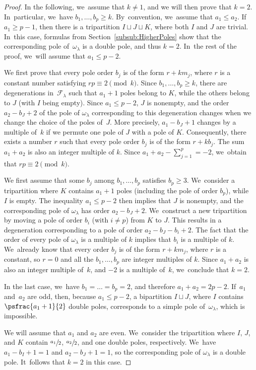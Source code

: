 \begin{proof}
In the following, we~assume that $k \neq 1$, and we will then prove that $k = 2$. In~particular, we~have $b_{1},\dots,b_{p} \geq k$. By~convention, we~assume that $a_{1} \leq a_{2}$. If~$a_{1} \geq p-1$, then there is a tripartition $I \sqcup J \sqcup K$, where both $I$ and $J$ are trivial. In~this case, formulas from Section~\ref{subsub:HigherPoles} show that the corresponding pole of~$\omega_{\lambda}$ is a double pole, and thus $k=2$. In~the rest of the proof, we~will assume that $a_{1} \leq p-2$.

We first prove that every pole order $b_{j}$ is of the form $r+km_{j}$, where $r$ is a constant number satisfying $rp \equiv 2\pmod{k}$. Since $b_{1},\dots,b_{p} \geq k$, there are degenerations in~$\mathcal{F}_{\lambda}$ such that $a_{1}+1$ poles belong to $K$, while the others belong to $J$ (with $I$ being empty). Since $a_{1} \leq p-2$, $J$ is nonempty, and the order $a_{2}-b_{J}+2$ of the pole of $\omega_{\lambda}$ corresponding to this degeneration changes when we change the choice of the poles of~$J$. More precisely, $a_{1}-b_{J}+1$ changes by a multiple of~$k$ if we permute one pole of $J$ with a pole of $K$. Consequently, there exists a number $r$ such that every pole order $b_{j}$ is of the form $r+kb_{j}$. The sum $a_{1}+a_{2}$ is also an integer multiple of $k$. Since $a_{1}+a_{2} - \sum_{j=1}^{p}=-2$, we~obtain that $rp \equiv 2 \pmod{k}$.

We first assume that some $b_{j}$ among $b_{1},\dots,b_{p}$ satisfies $b_{p} \geq 3$. We~consider a tripartition where $K$ contains $a_{1}+1$ poles (including the pole of order $b_{p}$), while~$I$ is empty. The inequality $a_{1} \leq p-2$ then implies that $J$ is nonempty, and the corresponding pole of $\omega_{\lambda}$ has order $a_{2}-b_{J}+2$. We~construct a new tripartition by moving a pole of order $b_{i}$ (with $i \neq p$) from $K$ to $J$. This results in a degeneration corresponding to a pole of order $a_{2}-b_{J}-b_{i}+2$. The fact that the order of every pole of $\omega_{\lambda}$ is a multiple of $k$ implies that $b_{i}$ is a multiple of $k$. We~already know that every order $b_{j}$ is of the form $r+km_{j}$, where $r$ is a constant, so $r=0$ and all the $b_{1},\dots,b_{p}$ are integer multiples of $k$. Since $a_{1}+a_{2}$ is also an integer multiple of~$k$, and $-2$ is a multiple of~$k$, we~conclude that $k=2$.

In the last case, we~have $b_{1}=\dots=b_{p}=2$, and therefore $a_{1}+a_{2}=2p-2$. If~$a_{1}$ and~$a_{2}$ are odd, then, because $a_{1} \leq p-2$, a bipartition $I \sqcup J$, where $I$ contains $\psfrac{a_{1}+1}{2}$ double poles, corresponds to a simple pole of~$\omega_{\lambda}$, which is impossible.

We will assume that $a_{1}$ and $a_{2}$ are even. We~consider the tripartition where $I$, $J$, and $K$ contain $\sfrac{a_{1}}{2}$, $\sfrac{a_{2}}{2}$, and one double poles, respectively. We~have $a_{1}-b_{I}+1=1$ and $a_{2}-b_{J}+1=1$, so the corresponding pole of $\omega_{\lambda}$ is a double pole. It~follows that $k=2$ in this case.
\end{proof}

